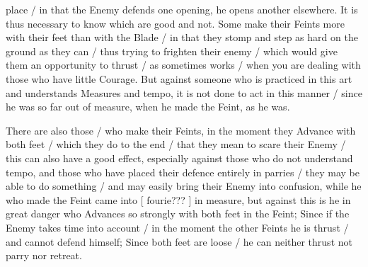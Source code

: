\newpage


\newpage



place / in that the Enemy defends one opening, he opens another
elsewhere. It is thus necessary to know which are good and not. Some
make their Feints more with their feet than with the Blade / in that
they stomp and step as hard on the ground as they can / thus trying to
frighten their enemy / which would give them an opportunity to thrust
/ as sometimes works / when you are dealing with those who have little
Courage. But against someone who is practiced in this art and
understands Measures and tempo, it is not done to act in this manner /
since he was so far out of measure, when he made the Feint, as he was.


There are also those / who make their Feints, in the moment they
Advance with both feet / which they do to the end / that they mean to
scare their Enemy / this can also have a good effect, especially
against those who do not understand tempo, and those who have placed
their defence entirely in parries / they may be able to do something /
and may easily bring their Enemy into confusion, while he who made the
Feint came into [ fourie??? ] in measure, but against this is he in
great danger who Advances so strongly with both feet in the Feint;
Since if the Enemy takes time into account / in the moment the other
Feints he is thrust / and cannot defend himself; Since both feet are
loose / he can neither thrust not parry nor retreat.

